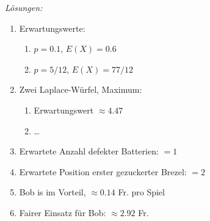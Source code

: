 \clearpage
\emph{Lösungen:}
\begin{enumerate}
    \item Erwartungswerte:
          \begin{enumerate}
              \item \(p= 0.1\), \(E(X) =0.6\)
              \item \(p= 5/12\), \(E(X) =77/12\)
          \end{enumerate}

    \item Zwei Laplace-Würfel, Maximum:
          \begin{enumerate}
              \item Erwartungswert \(\approx 4.47\)
              \item \dots
          \end{enumerate}


    \item Erwartete Anzahl defekter Batterien: \(= 1\)

    \item Erwartete Position erster gezuckerter Brezel: \(= 2\)

    \item Bob is im Vorteil, \(\approx 0.14\) Fr. pro Spiel

    \item Fairer Einsatz für Bob: \(\approx 2.92\) Fr.
\end{enumerate}























\clearpage
